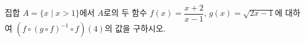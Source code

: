 집합 $A=\{x \mid x>1\}$에서 $A$로의 두 함수 $f(x)=\dfrac{x+2}{x-1}$, $g(x)=\sqrt{2x-1}$에 대하여 $(f\circ(g\circ f)^{-1}\circ f)(4)$의 값을 구하시오.
